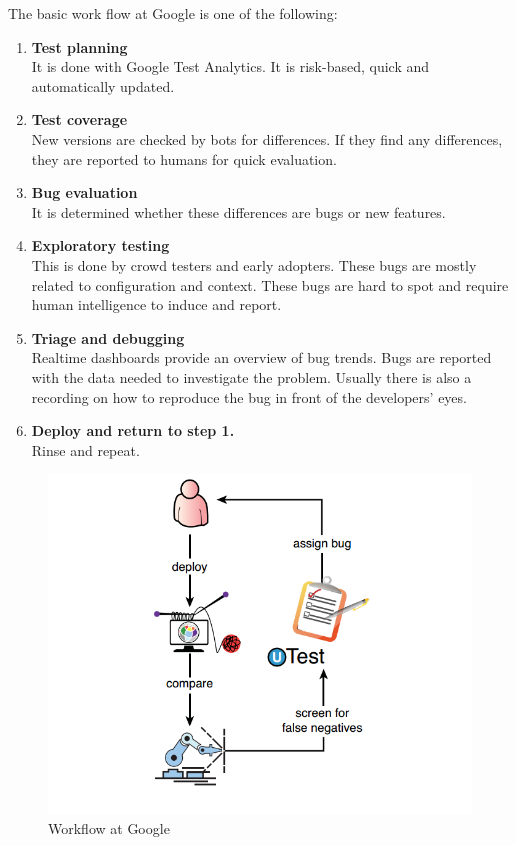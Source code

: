     The basic work flow at Google is one of the following:
    \begin{enumerate}
        \item \textbf{Test planning} \\
        It is done with Google Test Analytics. It is risk-based, quick and automatically updated.
        \item \textbf{Test coverage} \\
        New versions are checked by bots for differences. If they find any differences, they are reported to humans for quick evaluation.
        \item \textbf{Bug evaluation} \\
        It is determined whether these differences are bugs or new features.
        \item \textbf{Exploratory testing} \\
        This is done by crowd testers and early adopters. These bugs are mostly related to configuration and context. These bugs are hard to spot and require human intelligence to induce and report.
        \item \textbf{Triage and debugging} \\
        Realtime dashboards provide an overview of bug trends. Bugs are reported with the data needed to investigate the problem.
        Usually there is also a recording on how to reproduce the bug in front of the developers' eyes.
        \item \textbf{Deploy and return to step 1.} \\
        Rinse and repeat.
    \end{enumerate}

    \begin{figure}[hbtp]
        \centering
        \includegraphics[width=0.95\columnwidth]{img/testingWorkflow.png}
        \caption{Workflow at Google}
        \label{fig:WorkflowAtGoogleTDD}
    \end{figure}

